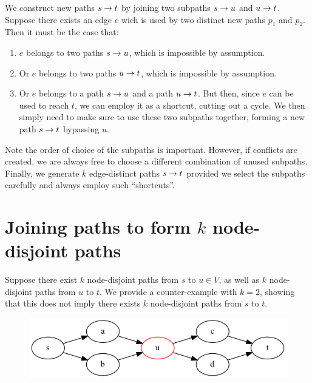 We construct new paths $s \rightarrow t$ by joining two subpaths $s \rightarrow u$ and $u \rightarrow t$. Suppose there exists an edge $e$ wich is used by two distinct new paths $p_1$ and $p_2$. Then it must be the case that:

\begin{enumerate}
  \item $e$ belongs to two paths $s \rightarrow u$, which is impossible by assumption.
  \item Or $e$ belongs to two paths $u \rightarrow t$, which is impossible by assumption.
  \item Or $e$ belongs to a path $s \rightarrow u$ and a path $u \rightarrow t$. But then, since $e$ can be used to reach $t$, we can employ it as a shortcut, cutting out a cycle. We then simply need to make sure to use these two subpaths together, forming a new path $s \rightarrow t$ bypassing $u$.
\end{enumerate}

Note the order of choice of the subpaths is important. However, if conflicts are created, we are always free to choose a different combination of unused subpaths. Finally, we generate $k$ edge-distinct paths $s \rightarrow t$ provided we select the subpaths carefully and always employ such ``shortcuts''.

\section{Joining paths to form $k$ \textbf{node}-disjoint paths}
Suppose there exist $k$ node-disjoint paths from $s$ to $u \in V$, as well as $k$ node-disjoint paths from $u$ to $t$. We provide a counter-example with $k = 2$, showing that this does not imply there exists $k$ node-disjoint paths from $s$ to $t$.

\begin{figure}[ht]
  \center
  \includegraphics[width=12cm]{figures/3-4-graph.png}
\end{figure}
